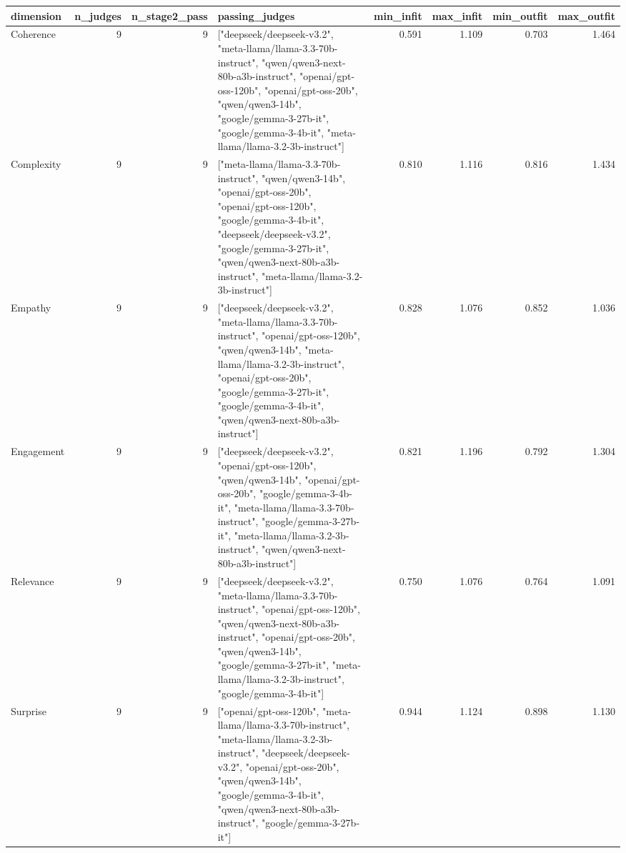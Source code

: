 \begin{tabular}{lrrlrrrr}
\toprule
dimension & n\_judges & n\_stage2\_pass & passing\_judges & min\_infit & max\_infit & min\_outfit & max\_outfit \\
\midrule
Coherence & 9 & 9 & ["deepseek/deepseek-v3.2", "meta-llama/llama-3.3-70b-instruct", "qwen/qwen3-next-80b-a3b-instruct", "openai/gpt-oss-120b", "openai/gpt-oss-20b", "qwen/qwen3-14b", "google/gemma-3-27b-it", "google/gemma-3-4b-it", "meta-llama/llama-3.2-3b-instruct"] & 0.591 & 1.109 & 0.703 & 1.464 \\
Complexity & 9 & 9 & ["meta-llama/llama-3.3-70b-instruct", "qwen/qwen3-14b", "openai/gpt-oss-20b", "openai/gpt-oss-120b", "google/gemma-3-4b-it", "deepseek/deepseek-v3.2", "google/gemma-3-27b-it", "qwen/qwen3-next-80b-a3b-instruct", "meta-llama/llama-3.2-3b-instruct"] & 0.810 & 1.116 & 0.816 & 1.434 \\
Empathy & 9 & 9 & ["deepseek/deepseek-v3.2", "meta-llama/llama-3.3-70b-instruct", "openai/gpt-oss-120b", "qwen/qwen3-14b", "meta-llama/llama-3.2-3b-instruct", "openai/gpt-oss-20b", "google/gemma-3-27b-it", "google/gemma-3-4b-it", "qwen/qwen3-next-80b-a3b-instruct"] & 0.828 & 1.076 & 0.852 & 1.036 \\
Engagement & 9 & 9 & ["deepseek/deepseek-v3.2", "openai/gpt-oss-120b", "qwen/qwen3-14b", "openai/gpt-oss-20b", "google/gemma-3-4b-it", "meta-llama/llama-3.3-70b-instruct", "google/gemma-3-27b-it", "meta-llama/llama-3.2-3b-instruct", "qwen/qwen3-next-80b-a3b-instruct"] & 0.821 & 1.196 & 0.792 & 1.304 \\
Relevance & 9 & 9 & ["deepseek/deepseek-v3.2", "meta-llama/llama-3.3-70b-instruct", "openai/gpt-oss-120b", "qwen/qwen3-next-80b-a3b-instruct", "openai/gpt-oss-20b", "qwen/qwen3-14b", "google/gemma-3-27b-it", "meta-llama/llama-3.2-3b-instruct", "google/gemma-3-4b-it"] & 0.750 & 1.076 & 0.764 & 1.091 \\
Surprise & 9 & 9 & ["openai/gpt-oss-120b", "meta-llama/llama-3.3-70b-instruct", "meta-llama/llama-3.2-3b-instruct", "deepseek/deepseek-v3.2", "openai/gpt-oss-20b", "qwen/qwen3-14b", "google/gemma-3-4b-it", "qwen/qwen3-next-80b-a3b-instruct", "google/gemma-3-27b-it"] & 0.944 & 1.124 & 0.898 & 1.130 \\
\bottomrule
\end{tabular}

